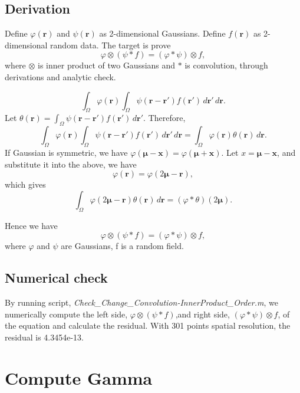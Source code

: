 \documentclass[a4paper, 12pt, english]{article}
\begin{document}
\subsection{Derivation}
Define $\varphi(\boldsymbol{r}) $ and $\psi(\boldsymbol{r}) $ as 2-dimensional Gaussians.
Define $f(\boldsymbol{r}) $ as 2-dimensional random data. The target is prove
$$ \varphi \otimes (\psi \ast f) = (\varphi \ast \psi) \otimes f, $$
where $\otimes $ is inner product of two Gaussians and $\ast $ is convolution, through derivations and analytic check.\par
$$\int_{\Omega}\varphi(\boldsymbol{r})\int_{\Omega}\psi(\boldsymbol{r} - \boldsymbol{r\prime})f(\boldsymbol{r\prime})\,d\boldsymbol{r\prime}\,d\boldsymbol{r}. $$
Let $\theta(\boldsymbol{r}) =  \int_{\Omega}\psi(\boldsymbol{r} - \boldsymbol{r\prime})f(\boldsymbol{r\prime})\,d\boldsymbol{r\prime}.$ Therefore,
$$\int_{\Omega}\varphi(\boldsymbol{r})\int_{\Omega}\psi(\boldsymbol{r} - \boldsymbol{r\prime})f(\boldsymbol{r\prime})\,d\boldsymbol{r\prime}\,d\boldsymbol{r}=
\int_{\Omega}\varphi(\boldsymbol{r})\theta(\boldsymbol{r})\,d\boldsymbol{r}. $$
If Gaussian is symmetric, we have $\varphi(\boldsymbol{\mu}-\boldsymbol{x}) = \varphi(\boldsymbol{\mu}+\boldsymbol{x}). $\newline
Let $x= \boldsymbol{\mu}-\boldsymbol{x}$, and substitute it into the above, we have
$$\varphi(\boldsymbol{r}) = \varphi(2\boldsymbol{\mu} - \boldsymbol{r}) ,$$
which gives
$$\int_{\Omega}\varphi(2\boldsymbol{\mu} - \boldsymbol{r})\theta(\boldsymbol{r})\,d\boldsymbol{r} = (\varphi \ast \theta)(2\boldsymbol{\mu}). $$

Hence we have
$$\varphi \otimes (\psi \ast f) = (\varphi \ast \psi) \otimes f, $$
where $\varphi $ and $\psi $ are Gaussians, f is a random field.

\subsection{Numerical check}
By running script, \textit{Check\_Change\_Convolution-InnerProduct\_Order.m}, we numerically
compute the left side, $\varphi \otimes (\psi \ast f)$,and right side, $(\varphi \ast \psi) \otimes f $,
of the equation and calculate the residual.
With 301 points spatial resolution, the residual is 4.3454e-13.

\newpage

\section{Compute Gamma}
\end{document}
